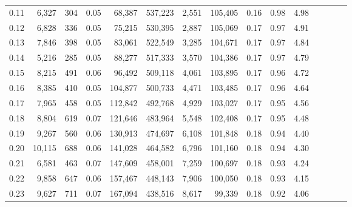 \begin{tabular}{rrrcrrrrrrrrrrr}
0.11 &   6,327 &    304 &                                       0.05 &   68,387 &  537,223 &    2,551 &  105,405 &  0.16 &  0.98 &                         4.98 \\
0.12 &   6,828 &    336 &                                       0.05 &   75,215 &  530,395 &    2,887 &  105,069 &  0.17 &  0.97 &                         4.91 \\
0.13 &   7,846 &    398 &                                       0.05 &   83,061 &  522,549 &    3,285 &  104,671 &  0.17 &  0.97 &                         4.84 \\
0.14 &   5,216 &    285 &                                       0.05 &   88,277 &  517,333 &    3,570 &  104,386 &  0.17 &  0.97 &                         4.79 \\
0.15 &   8,215 &    491 &                                       0.06 &   96,492 &  509,118 &    4,061 &  103,895 &  0.17 &  0.96 &                         4.72 \\
0.16 &   8,385 &    410 &                                       0.05 &  104,877 &  500,733 &    4,471 &  103,485 &  0.17 &  0.96 &                         4.64 \\
0.17 &   7,965 &    458 &                                       0.05 &  112,842 &  492,768 &    4,929 &  103,027 &  0.17 &  0.95 &                         4.56 \\
0.18 &   8,804 &    619 &                                       0.07 &  121,646 &  483,964 &    5,548 &  102,408 &  0.17 &  0.95 &                         4.48 \\
0.19 &   9,267 &    560 &                                       0.06 &  130,913 &  474,697 &    6,108 &  101,848 &  0.18 &  0.94 &                         4.40 \\
0.20 &  10,115 &    688 &                                       0.06 &  141,028 &  464,582 &    6,796 &  101,160 &  0.18 &  0.94 &                         4.30 \\
0.21 &   6,581 &    463 &                                       0.07 &  147,609 &  458,001 &    7,259 &  100,697 &  0.18 &  0.93 &                         4.24 \\
0.22 &   9,858 &    647 &                                       0.06 &  157,467 &  448,143 &    7,906 &  100,050 &  0.18 &  0.93 &                         4.15 \\
0.23 &   9,627 &    711 &                                       0.07 &  167,094 &  438,516 &    8,617 &   99,339 &  0.18 &  0.92 &                         4.06 \\

\end{tabular}
